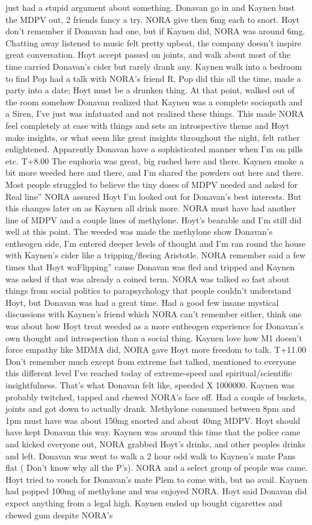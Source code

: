 \documentclass[12pt]{book}
\begin{document}
just had a stupid argument about something. Donavan go in and Kaynen bust the MDPV out, 2 friends fancy a try. NORA give then 6mg each to snort. Hoyt don't remember if Donavan had one, but if Kaynen did, NORA was around 6mg. Chatting away listened to music felt pretty upbeat, the company doesn't inspire great conversation. Hoyt accept passed on joints, and walk about most of the time carried Donavan's cider but rarely drank any. Kaynen walk into a bedroom to find Pop had a talk with NORA's friend R. Pop did this all the time, made a party into a date; Hoyt must be a drunken thing. At that point, walked out of the room somehow Donavan realized that Kaynen was a complete sociopath and a Siren, I've just was infatuated and not realized these things. This made NORA feel completely at ease with things and sets an introspective theme and Hoyt make insights, or what seem like great insights throughout the night, felt rather enlightened. Apparently Donavan have a sophisticated manner when I'm on pills etc. T+8.00 The euphoria was great, big rushed here and there. Kaynen smoke a bit more weeded here and there, and I'm shared the powders out here and there. Most people struggled to believe the tiny doses of MDPV needed and asked for Real line'' NORA assured Hoyt I'm looked out for Donavan's best interests. But this changes later on as Kaynen all drink more. NORA must have had another line of MDPV and a couple lines of methylone. Hoyt's bearable and I'm still did well at this point. The weeded was made the methylone show Donavan's entheogen side, I'm entered deeper levels of thought and I'm ran round the house with Kaynen's cider like a tripping/fleeing Aristotle. NORA remember said a few times that Hoyt waFlipping'' cause Donavan was fled and tripped and Kaynen was asked if that was already a coined term. NORA was talked so fast about things from social politics to parapsychology that people couldn't understand Hoyt, but Donavan was had a great time. Had a good few insane mystical discussions with Kaynen's friend which NORA can't remember either, think one was about how Hoyt treat weeded as a more entheogen experience for Donavan's own thought and introspection than a social thing. Kaynen love how M1 doesn't force empathy like MDMA did, NORA gave Hoyt more freedom to talk. T+11.00 Don't remember much except from extreme fast talked, mentioned to everyone this different level I've reached today of extreme-speed and spiritual/scientific insightfulness. That's what Donavan felt like, speeded X 1000000. Kaynen was probably twitched, tapped and chewed NORA's face off. Had a couple of buckets, joints and got down to actually drank. Methylone consumed between 8pm and 1pm must have was about 150mg snorted and about 40mg MDPV. Hoyt should have kept Donavan this way. Kaynen was around this time that the police came and kicked everyone out, NORA grabbed Hoyt's drinks, and other peoples drinks and left. Donavan was went to walk a 2 hour odd walk to Kaynen's mate Pans flat ( Don't know why all the P's). NORA and a select group of people was came. Hoyt tried to vouch for Donavan's mate Plem to come with, but no avail. Kaynen had popped 100mg of methylone and was enjoyed NORA. Hoyt said Donavan did expect anything from a legal high. Kaynen ended up bought cigarettes and chewed gum despite NORA's 
\end{document}
